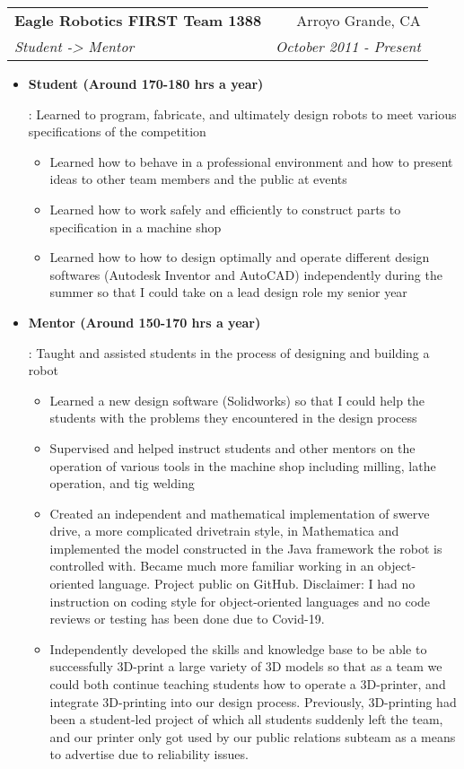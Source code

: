 \documentclass[letterpaper,10pt]{article}
\makeatletter
\newcommand{\resumeItem}[2]{
  \item\small{
    \textbf{#1}{: #2 \vspace{-2pt}}
  }
}
\newcommand{\resumeSubheading}[4]{
  \vspace{-1pt}\item[]
  \begin{tabular*}{0.98\textwidth}{l@{\extracolsep{\fill}}r}
      \hspace{-10pt}\textbf{#1} & #2 \\
      \hspace{-10pt}\textit{\small#3} & \textit{\small #4} \\
    \end{tabular*}\vspace{-5pt}
}
\newcommand{\resumeItemListStart}{\begin{itemize}}
\newcommand{\resumeItemListEnd}{\end{itemize}\vspace{-5pt}}
\makeatother
\begin{document}
    \resumeSubheading
      {Eagle Robotics FIRST Team 1388}{Arroyo Grande, CA}
      {Student -> Mentor}{October 2011 - Present}
      \resumeItemListStart
        \resumeItem{Student (Around 170-180 hrs a year)}
          {Learned to program, fabricate, and ultimately design robots to meet various specifications of the competition
          \begin{itemize}
              \item Learned how to behave in a professional environment and how to present ideas to other team members and the public at events
              \item Learned how to work safely and efficiently to construct parts to specification in a machine shop
              \item Learned how to how to design optimally and operate different design softwares (Autodesk Inventor and AutoCAD) independently during the summer so that I could take on a lead design role my senior year
          \end{itemize}
          }
          \resumeItem{Mentor (Around 150-170 hrs a year)}
          {Taught and assisted students in the process of designing and building a robot
          \begin{itemize}
              \item Learned a new design software (Solidworks) so that I could help the students with the problems they encountered in the design process
              \item Supervised and helped instruct students and other mentors on the operation of various tools in the machine shop including milling, lathe operation, and tig welding
              \item Created an independent and mathematical implementation of swerve drive, a more complicated drivetrain style, in Mathematica and implemented the model constructed in the Java framework the robot is controlled with. Became much more familiar working in an object-oriented language. Project public on GitHub. Disclaimer: I had no instruction on coding style for object-oriented languages and no code reviews or testing has been done due to Covid-19.
	   \item Independently developed the skills and knowledge base to be able to successfully 3D-print a large variety of 3D models so that as a team we could both continue teaching students how to operate a 3D-printer, and integrate 3D-printing into our design process. Previously, 3D-printing had been a student-led project of which all students suddenly left the team, and our printer only got used by our public relations subteam as a means to advertise due to reliability issues.
          \end{itemize}
          }
      \resumeItemListEnd
\end{document}
